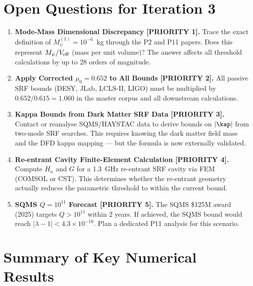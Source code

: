 \documentclass[11pt,twocolumn]{article}
\newcommand{\lam}{\lambda}
\newcommand{\Mpsi}{M_\psi}
\begin{document}
\section{Open Questions for Iteration 3}
\label{sec:open_questions}

\begin{enumerate}[label=\textbf{OQ\arabic*.}]

\item \textbf{Mode-Mass Dimensional Discrepancy [PRIORITY 1].}
Trace the exact definition of $\Mpsi^{(1)} = 10^{-6}$~kg through the P2 and
P11 papers. Does this represent $\Mpsi/V_{\rm eff}$ (mass per unit volume)?
The answer affects all threshold calculations by up to 28 orders of magnitude.

\item \textbf{Apply Corrected $\mu_0 = 0.652$ to All Bounds [PRIORITY 2].}
All passive SRF bounds (DESY, JLab, LCLS-II, LIGO) must be multiplied by
$0.652/0.615 = 1.060$ in the master corpus and all downstream calculations.

\item \textbf{Kappa Bounds from Dark Matter SRF Data [PRIORITY 3].}
Contact or reanalyse SQMS/HAYSTAC data to derive bounds on $|\kap|$ from
two-mode SRF searches. This requires knowing the dark matter field mass and
the DFD kappa mapping --- but the formula is now externally validated.

\item \textbf{Re-entrant Cavity Finite-Element Calculation [PRIORITY 4].}
Compute $H_n$ and $G$ for a 1.3~GHz re-entrant SRF cavity via FEM (COMSOL
or CST). This determines whether the re-entrant geometry actually reduces
the parametric threshold to within the current bound.

\item \textbf{SQMS $Q = 10^{11}$ Forecast [PRIORITY 5].}
The SQMS \$125M award (2025) targets $Q > 10^{11}$ within 2 years. If achieved,
the SQMS bound would reach $|\lam-1| < 4.3\times10^{-10}$. Plan a dedicated
P11 analysis for this scenario.

\end{enumerate}


\section*{Summary of Key Numerical Results}
\end{document}

